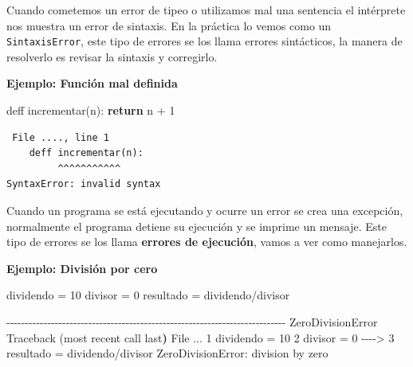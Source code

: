 \documentclass[
  letterpaper,
  DIV=11,
  numbers=noendperiod]{scrreprt}
\newenvironment{Shaded}{\begin{snugshade}}{\end{snugshade}}
\newcommand{\ControlFlowTok}[1]{\textcolor[rgb]{0.00,0.23,0.31}{\textbf{#1}}}
\newcommand{\DecValTok}[1]{\textcolor[rgb]{0.68,0.00,0.00}{#1}}
\newcommand{\ErrorTok}[1]{\textcolor[rgb]{0.68,0.00,0.00}{#1}}
\newcommand{\ExtensionTok}[1]{\textcolor[rgb]{0.00,0.23,0.31}{#1}}
\newcommand{\KeywordTok}[1]{\textcolor[rgb]{0.00,0.23,0.31}{\textbf{#1}}}
\newcommand{\NormalTok}[1]{\textcolor[rgb]{0.00,0.23,0.31}{#1}}
\newcommand{\OperatorTok}[1]{\textcolor[rgb]{0.37,0.37,0.37}{#1}}
\begin{document}
Cuando cometemos un error de tipeo o utilizamos mal una sentencia el
intérprete nos muestra un error de sintaxis. En la práctica lo vemos
como un \texttt{SintaxisError}, este tipo de errores se los llama
errores sintácticos, la manera de resolverlo es revisar la sintaxis y
corregirlo.

\textbf{Ejemplo: Función mal definida}

\begin{Shaded}
\begin{Highlighting}[]
\NormalTok{deff incrementar(n):}
  \ControlFlowTok{return}\NormalTok{ n }\OperatorTok{+} \DecValTok{1}
\end{Highlighting}
\end{Shaded}

\begin{verbatim}
 File ...., line 1
    deff incrementar(n):
         ^^^^^^^^^^^
SyntaxError: invalid syntax
\end{verbatim}

Cuando un programa se está ejecutando y ocurre un error se crea una
excepción, normalmente el programa detiene su ejecución y se imprime un
mensaje. Este tipo de errores se los llama \textbf{errores de
ejecución}, vamos a ver como manejarlos.

\textbf{Ejemplo: División por cero}

\begin{Shaded}
\begin{Highlighting}[]
\NormalTok{dividendo }\OperatorTok{=} \DecValTok{10}
\NormalTok{divisor }\OperatorTok{=} \DecValTok{0}
\NormalTok{resultado }\OperatorTok{=}\NormalTok{ dividendo}\OperatorTok{/}\NormalTok{divisor }
\end{Highlighting}
\end{Shaded}

\begin{Shaded}
\begin{Highlighting}[]
\ExtensionTok{{-}{-}{-}{-}{-}{-}{-}{-}{-}{-}{-}{-}{-}{-}{-}{-}{-}{-}{-}{-}{-}{-}{-}{-}{-}{-}{-}{-}{-}{-}{-}{-}{-}{-}{-}{-}{-}{-}{-}{-}{-}{-}{-}{-}{-}{-}{-}{-}{-}{-}{-}{-}{-}{-}{-}{-}{-}{-}{-}{-}{-}{-}{-}{-}{-}{-}{-}{-}{-}{-}{-}{-}{-}{-}{-}}
\ExtensionTok{ZeroDivisionError}\NormalTok{                         Traceback }\ErrorTok{(}\ExtensionTok{most}\NormalTok{ recent call last}\KeywordTok{)}
\ExtensionTok{File}\NormalTok{ ...}
      \ExtensionTok{1}\NormalTok{ dividendo = 10}
      \ExtensionTok{2}\NormalTok{ divisor = 0}
\ExtensionTok{{-}{-}{-}{-}}\OperatorTok{\textgreater{}}\NormalTok{ 3 resultado = dividendo/divisor }
\ExtensionTok{ZeroDivisionError:}\NormalTok{ division by zero}
\end{Highlighting}
\end{Shaded}
\end{document}
